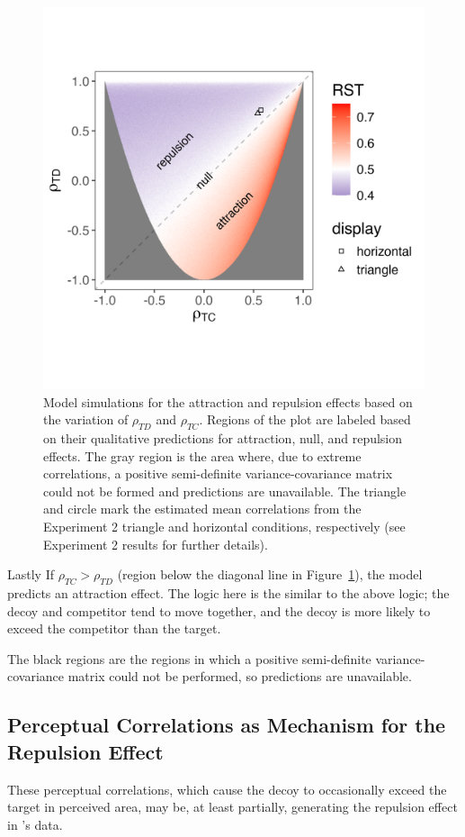 \begin{figure}
   \centering
   \includegraphics[width=\linewidth]{figures/3d_sim_rst.jpg}
   \caption{Model simulations for the attraction and repulsion effects based on the variation of $\rho_{TD}$ and $\rho_{TC}$. Regions of the plot are labeled based on their qualitative predictions for attraction, null, and repulsion effects. The gray region is the area where, due to extreme correlations, a positive semi-definite variance-covariance matrix could not be formed and predictions are unavailable. The triangle and circle mark the estimated mean correlations from the Experiment 2 triangle and horizontal conditions, respectively (see Experiment 2 results for further details).}
   \label{fig:3d_model}
\end{figure}

Lastly If $\rho_{TC}>\rho_{TD}$ (region below the diagonal line in Figure~\ref{fig:3d_model}), the model predicts an attraction effect. The logic here is the similar to the above logic; the decoy and competitor tend to move together, and the decoy is more likely to exceed the competitor than the target. 

The black regions are the regions in which a positive semi-definite variance-covariance matrix could not be performed, so predictions are unavailable.

\subsection{Perceptual Correlations as Mechanism for the Repulsion Effect}
These perceptual correlations, which cause the decoy to occasionally exceed the target in perceived area, may be, at least partially, generating the repulsion effect in \textcite{spektorWhenGoodLooks2018b}'s data. 

